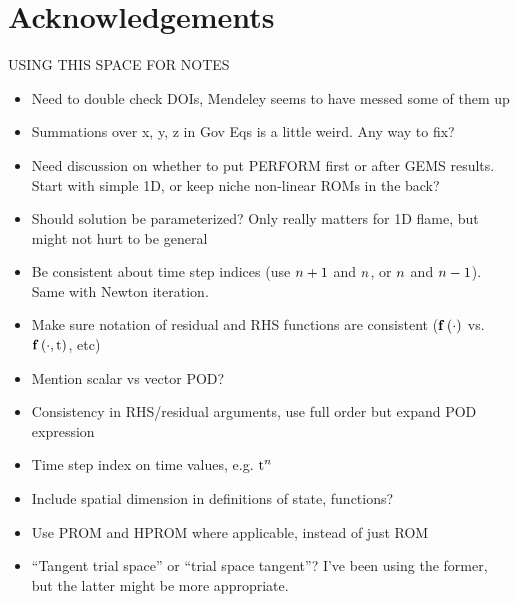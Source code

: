 \chapter{Acknowledgements}

{\color{red}
USING THIS SPACE FOR NOTES
\begin{itemize}
	\item Need to double check DOIs, Mendeley seems to have messed some of them up
	\item Summations over x, y, z in Gov Eqs is a little weird. Any way to fix?
	\item Need discussion on whether to put PERFORM first or after GEMS results. Start with simple 1D, or keep niche non-linear ROMs in the back?
	\item Should solution be parameterized? Only really matters for 1D flame, but might not hurt to be general
	\item Be consistent about time step indices (use $n + 1$ and $n$, or $n$ and $n - 1$). Same with Newton iteration.
	\item Make sure notation of residual and RHS functions are consistent ($\mathbf{f} \left(\cdot\right)$ vs. $\mathbf{f} \left(\cdot, \text{t}\right)$, etc)
	\item Mention scalar vs vector POD?
	\item Consistency in RHS/residual arguments, use full order but expand POD expression
	\item Time step index on time values, e.g. $\text{t}^{n}$
	\item Include spatial dimension in definitions of state, functions?
	\item Use PROM and HPROM where applicable, instead of just ROM
	\item ``Tangent trial space'' or ``trial space tangent''? I've been using the former, but the latter might be more appropriate.
\end{itemize}

}